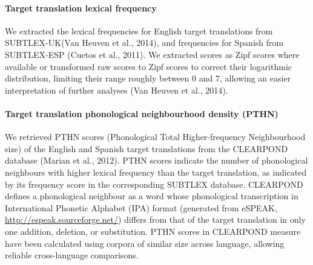 \documentclass[
  english,
  man,floatsintext]{apa7}
\let\oldparagraph\paragraph
\renewcommand{\paragraph}[1]{\oldparagraph{#1}\mbox{}}
\begin{document}
\hypertarget{target-translation-lexical-frequency}{%
\paragraph{Target translation lexical frequency}\label{target-translation-lexical-frequency}}

We extracted the lexical frequencies for English target translations from SUBTLEX-UK(Van Heuven et al., 2014), and frequencies for Spanish from SUBTLEX-ESP (Cuetos et al., 2011). We extracted scores as Zipf scores where available or transformed raw scores to Zipf scores to correct their logarithmic distribution, limiting their range roughly between 0 and 7, allowing an easier interpretation of further analyses (Van Heuven et al., 2014).

\hypertarget{target-translation-phonological-neighbourhood-density-pthn}{%
\paragraph{Target translation phonological neighbourhood density (PTHN)}\label{target-translation-phonological-neighbourhood-density-pthn}}

We retrieved PTHN scores (Phonological Total Higher-frequency Neighbourhood size) of the English and Spanish target translations from the CLEARPOND database (Marian et al., 2012). PTHN scores indicate the number of phonological neighbours with higher lexical frequency than the target translation, as indicated by its frequency score in the corresponding SUBTLEX database. CLEARPOND defines a phonological neighbour as a word whose phonological transcription in International Phonetic Alphabet (IPA) format (generated from eSPEAK, \url{http://espeak.sourceforge.net/}) differs from that of the target translation in only one addition, deletion, or substitution. PTHN scores in CLEARPOND measure have been calculated using corpora of similar size across language, allowing reliable cross-language comparisons.
\end{document}
